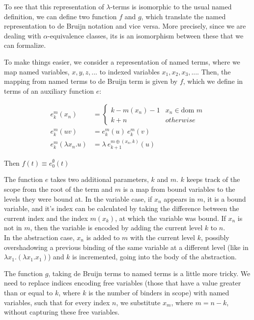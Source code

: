 \documentclass[a4paper, 12pt, twoside]{style/ociamthesis}
\begin{document}
To see that this representation of \(\lambda\)-terms is isomorphic to
the usual named definition, we can define two function \(f\) and \(g\),
which translate the named representation to de Bruijn notation and vice
versa. More precisely, since we are dealing with \(\alpha\)-equivalence
classes, its is an isomorphism between these that we can formalize.

To make things easier, we consider a representation of named terms,
where we map named variables, \(x, y, z,...\) to indexed variables
\(x_1,x_2,x_3,...\). Then, the mapping from named terms to de Bruijn
term is given by \(f\), which we define in terms of an auxiliary
function \(e\):

\begin{align*} 
e_k^m(x_n) &= \begin{cases}
k-m(x_n)-1 & x_n \in \text{dom }m\\
k+n & otherwise
\end{cases}\\
e_k^m(uv) &= e_k^m(u)\ e_k^m(v)\\
e_k^m(\lambda x_n.u) &= \lambda\ e_{k+1}^{m \oplus (x_n,k)}(u)
\end{align*}

Then \(f(t) \equiv e_0^\emptyset(t)\)

The function \(e\) takes two additional parameters, \(k\) and \(m\).
\(k\) keeps track of the scope from the root of the term and \(m\) is a
map from bound variables to the levels they were bound at. In the
variable case, if \(x_n\) appears in \(m\), it is a bound variable, and
it's index can be calculated by taking the difference between the
current index and the index \(m(x_k)\), at which the variable was bound.
If \(x_n\) is not in \(m\), then the variable is encoded by adding the
current level \(k\) to \(n\).\\
In the abstraction case, \(x_n\) is added to \(m\) with the current
level \(k\), possibly overshadowing a previous binding of the same
variable at a different level (like in
\(\lambda x_1. (\lambda x_1. x_1)\)) and \(k\) is incremented, going
into the body of the abstraction.

The function \(g\), taking de Bruijn terms to named terms is a little
more tricky. We need to replace indices encoding free variables (those
that have a value greater than or equal to \(k\), where \(k\) is the
number of binders in scope) with named variables, such that for every
index \(n\), we substitute \(x_m\), where \(m = n-k\), without capturing
these free variables.
\end{document}
